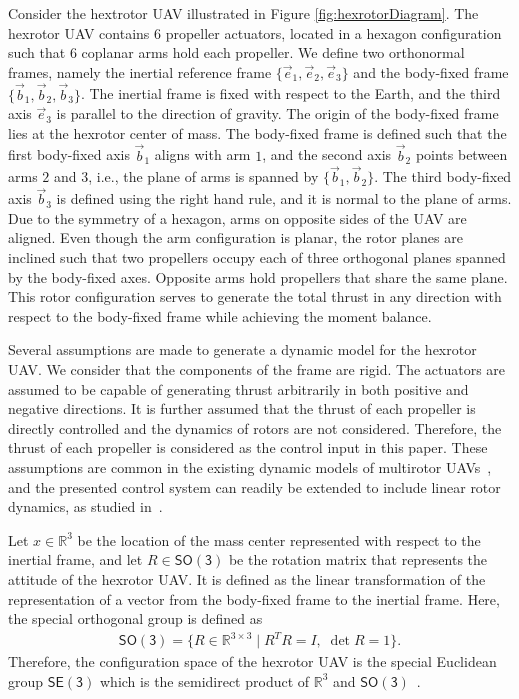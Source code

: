 \documentclass[twocolumn,letterpaper]{IEEEAerospaceCLS}  %
\newcommand{\SO}{\ensuremath{\mathsf{SO(3)}}}
\newcommand{\SE}{\ensuremath{\mathsf{SE(3)}}}
\renewcommand{\Re}{\mathbb{R}}
\begin{document}
Consider the hextrotor UAV illustrated in Figure \ref{fig:hexrotorDiagram}. The hexrotor UAV contains $6$ propeller actuators, located in a hexagon configuration such that $6$ coplanar arms hold each propeller. We define two orthonormal frames, namely the inertial reference frame $\{\vec e_1,\vec e_2,\vec e_3\}$ and the body-fixed frame $\{\vec b_1,\vec b_2,\vec b_3\}$. The inertial frame is fixed with respect to the Earth, and the third axis $\vec e_3$ is parallel to the direction of gravity. The origin of the body-fixed frame lies at the hexrotor center of mass. The body-fixed frame is defined such that the first body-fixed axis $\vec b_1$ aligns with arm $1$, and the second axis $\vec b_2$ points between arms $2$ and $3$, i.e., the plane of arms is spanned by $\{\vec b_1,\vec b_2\}$. The third body-fixed axis $\vec b_3$ is defined using the right hand rule, and it is normal to the plane of arms. Due to the symmetry of a hexagon, arms on opposite sides of the UAV are aligned. Even though the arm configuration is planar, the rotor planes are inclined such that two propellers occupy each of three orthogonal planes spanned by the body-fixed axes. Opposite arms hold propellers that share the same plane. This rotor configuration serves to generate the total thrust in any direction with respect to the body-fixed frame while achieving the moment balance.

Several assumptions are made to generate a dynamic model for the hexrotor UAV. We consider that the components of the frame are rigid. The actuators are assumed to be capable of generating thrust arbitrarily in both positive and negative directions. It is further assumed that the thrust of each propeller is directly controlled and the dynamics of rotors are not considered. Therefore, the thrust of each propeller is considered as the control input in this paper. These assumptions are common in the existing dynamic models of multirotor UAVs~\cite{TayMcGITCSTI06,CasLozICSM05}, and the presented control system can readily be extended to include linear rotor dynamics, as studied in~\cite{BouSiePIICRA05}.


Let $x\in{\Re}^3$ be the location of the mass center represented with respect to the inertial frame, and let $R\in\SO$ be the rotation matrix that represents the attitude of the hexrotor UAV. It is defined as the linear transformation of the representation of a vector from the body-fixed frame to the inertial frame. Here, the special orthogonal group is defined as
\begin{align*}
{\SO}=\{R \in{\Re}^{3\times3}\mid R^T R=I,\; \det{R}=1\}.
\end{align*}
Therefore, the configuration space of the hexrotor UAV is the special Euclidean group $\SE$ which is the semidirect product of ${\Re}^3$ and $\SO$~\cite{MarRat99}.
\end{document}

